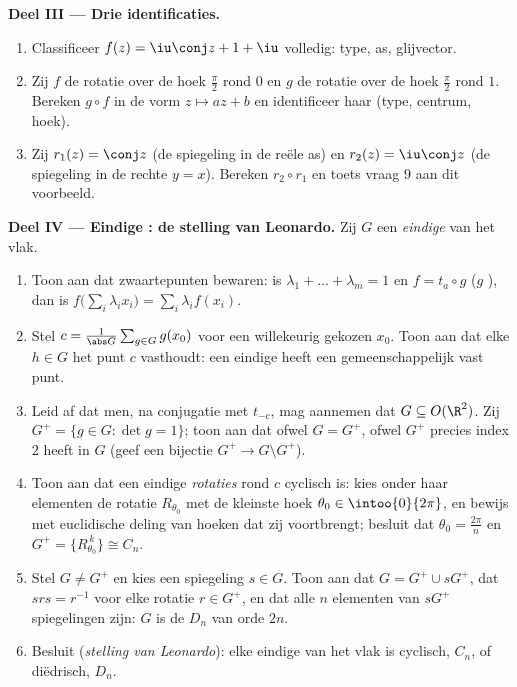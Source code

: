 \begin{problem}
\medskip
\noindent\textbf{Deel III --- Drie identificaties.}
\begin{enumerate}[resume]
  \item Classificeer $f(z) = \iu\conj z + 1 + \iu$ volledig: type,
        as, glijvector.
  \item Zij $f$ de rotatie over de hoek $\frac\pi2$ rond $0$ en $g$
        de rotatie over de hoek $\frac\pi2$ rond $1$. Bereken $g
        \circ f$ in de vorm $z \mapsto az + b$ en identificeer haar
        (type, centrum, hoek).
  \item Zij $r_1(z) = \conj z$ (de spiegeling in de reële as) en
        $r_2(z) = \iu\conj z$ (de spiegeling in de rechte $y = x$).
        Bereken $r_2 \circ r_1$ en toets vraag 9 aan dit voorbeeld.
\end{enumerate}

\medskip
\noindent\textbf{Deel IV --- Eindige : de stelling van
Leonardo.} Zij $G$ een \emph{eindige}   van het
vlak.
\begin{enumerate}[resume]
  \item Toon aan dat  zwaartepunten bewaren: is
        $\lambda_1 + \dots + \lambda_m = 1$ en $f = t_a \circ g$
        ($g$ ), dan is $f\bigl(\sum_i \lambda_i x_i\bigr) =
        \sum_i \lambda_i f(x_i)$.
  \item Stel $c = \frac{1}{\abs G}\sum_{g \in G} g(x_0)$ voor een
        willekeurig gekozen $x_0$. Toon aan dat elke $h \in G$ het
        punt $c$ vasthoudt: een eindige   heeft een
        gemeenschappelijk vast punt.
  \item Leid af dat men, na conjugatie met $t_{-c}$, mag aannemen
        dat $G \subseteq O(\R^2)$. Zij $G^{+} = \{g \in G : \det g
        = 1\}$; toon aan dat ofwel $G = G^{+}$, ofwel $G^{+}$
        precies index $2$ heeft in $G$ (geef een bijectie $G^+ \to
        G \setminus G^+$).
  \item Toon aan dat een eindige  \emph{rotaties} rond $c$
        cyclisch is: kies onder haar elementen de rotatie
        $R_{\theta_0}$ met de kleinste hoek $\theta_0 \in
        \intoo{0}{2\pi}$, en bewijs met euclidische deling van
        hoeken dat zij voortbrengt; besluit dat $\theta_0 =
        \frac{2\pi}n$ en $G^{+} = \{R_{\theta_0}^{\,k}\} \cong
        C_n$.
  \item Stel $G \neq G^{+}$ en kies een spiegeling $s \in G$. Toon
        aan dat $G = G^{+} \cup sG^{+}$, dat $s r s = r^{-1}$ voor
        elke rotatie $r \in G^{+}$, en dat alle $n$ elementen van
        $sG^{+}$ spiegelingen zijn: $G$ is de \emph{}
        $D_n$ van orde $2n$.
  \item Besluit (\emph{stelling van Leonardo}): elke eindige 
         van het vlak is cyclisch, $C_n$, of diëdrisch,
        $D_n$.
\end{enumerate}


\end{problem}
